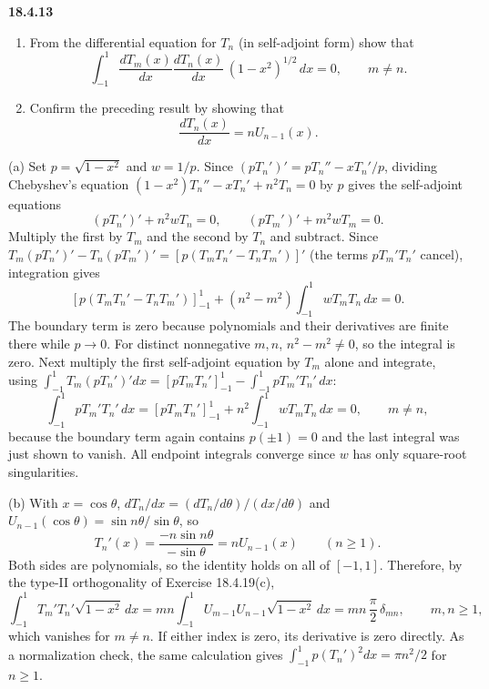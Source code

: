 \par\bigskip
\noindent\textbf{18.4.13}
\begin{enumerate}
\item[(a)] From the differential equation for $T_{n}$ (in
self-adjoint form) show that
\[
\int_{-1}^{1}\frac{dT_{m}(x)}{dx}\frac{dT_{n}(x)}{dx}\,
(1-x^{2})^{1/2}\,dx=0,\qquad m\neq n.
\]
\item[(b)] Confirm the preceding result by showing that
\[
\frac{dT_{n}(x)}{dx}=nU_{n-1}(x).
\]
\end{enumerate}
\solution
(a) Set $p=\sqrt{1-x^2}$ and $w=1/p$.  Since
$(pT_n')'=pT_n''-xT_n'/p$, dividing Chebyshev's equation
$(1-x^2)T_n''-xT_n'+n^2T_n=0$ by $p$ gives the self-adjoint equations
\[
(pT_n')'+n^2wT_n=0,\qquad (pT_m')'+m^2wT_m=0.
\]
Multiply the first by $T_m$ and the second by $T_n$ and subtract.
Since $T_m(pT_n')'-T_n(pT_m')'=[p(T_mT_n'-T_nT_m')]'$ (the terms
$pT_m'T_n'$ cancel), integration gives
\[
[p(T_mT_n'-T_nT_m')]_{-1}^1
 +(n^2-m^2)\int_{-1}^1wT_mT_n\,dx=0.
\]
The boundary term is zero because polynomials and their derivatives
are finite there while $p\to0$.  For distinct nonnegative $m,n$,
$n^2-m^2\ne0$, so the integral is zero.
Next multiply the first self-adjoint equation by $T_m$ alone and
integrate, using
$\int_{-1}^1T_m(pT_n')'dx=[pT_mT_n']_{-1}^1-\int_{-1}^1pT_m'T_n'\,dx$:
\[
\int_{-1}^1pT_m'T_n'\,dx
 =[pT_mT_n']_{-1}^1+n^2\int_{-1}^1wT_mT_n\,dx=\boxed{0},
 \qquad m\ne n,
\]
because the boundary term again contains $p(\pm1)=0$ and the last
integral was just shown to vanish.
All endpoint integrals converge since $w$ has only square-root
singularities.

(b) With $x=\cos\theta$, $dT_n/dx=(dT_n/d\theta)/(dx/d\theta)$ and
$U_{n-1}(\cos\theta)=\sin n\theta/\sin\theta$, so
\[
T_n'(x)=\frac{-n\sin n\theta}{-\sin\theta}
        =\boxed{nU_{n-1}(x)}\qquad(n\ge1).
\]
Both sides are polynomials, so the identity holds on all of $[-1,1]$.
Therefore, by the type-II orthogonality of Exercise 18.4.19(c),
\[
\int_{-1}^1T_m'T_n'\sqrt{1-x^2}\,dx
 =mn\int_{-1}^1U_{m-1}U_{n-1}\sqrt{1-x^2}\,dx
 =mn\,\frac\pi2\,\delta_{mn},\qquad m,n\ge1,
\]
which vanishes for $m\ne n$.  If either index is zero, its derivative
is zero directly.
As a normalization check, the same calculation gives
$\int_{-1}^1p(T_n')^2dx=\pi n^2/2$ for $n\ge1$.

